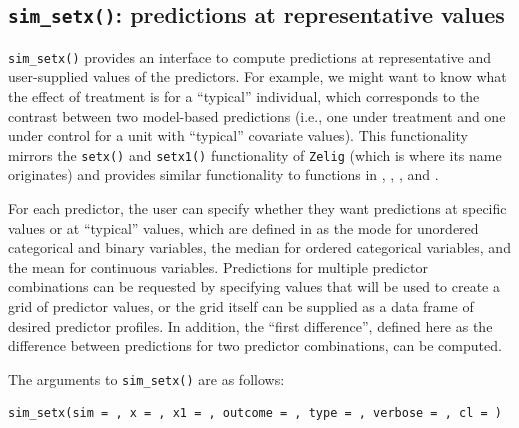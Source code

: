 \hypertarget{sim_setx-predictions-at-representative-values}{%
\subsection{\texorpdfstring{\texttt{sim\_setx()}: predictions at representative values}{sim\_setx(): predictions at representative values}}\label{sim_setx-predictions-at-representative-values}}

\texttt{sim\_setx()} provides an interface to compute predictions at representative and user-supplied values of the predictors. For example, we might want to know what the effect of treatment is for a ``typical'' individual, which corresponds to the contrast between two model-based predictions (i.e., one under treatment and one under control for a unit with ``typical'' covariate values). This functionality mirrors the \texttt{setx()} and \texttt{setx1()} functionality of \texttt{Zelig} (which is where its name originates) and provides similar functionality to functions in , , , and .

For each predictor, the user can specify whether they want predictions at specific values or at ``typical'' values, which are defined in  as the mode for unordered categorical and binary variables, the median for ordered categorical variables, and the mean for continuous variables. Predictions for multiple predictor combinations can be requested by specifying values that will be used to create a grid of predictor values, or the grid itself can be supplied as a data frame of desired predictor profiles. In addition, the ``first difference'', defined here as the difference between predictions for two predictor combinations, can be computed.

The arguments to \texttt{sim\_setx()} are as follows:

\begin{verbatim}
sim_setx(sim = , x = , x1 = , outcome = , type = , verbose = , cl = )
\end{verbatim}

